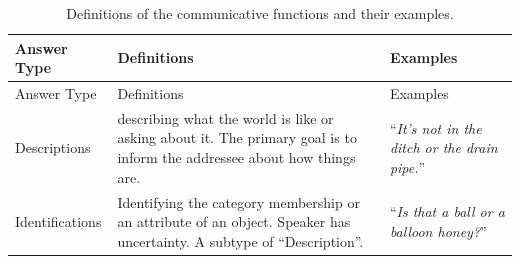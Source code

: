\documentclass[oneside]{report}
\theoremstyle{definition}
\theoremstyle{definition}
\theoremstyle{definition}
\theoremstyle{remark}
\begin{document}
\begin{longtable}[]{@{}lll@{}}
\caption{\label{tab:speechActs} Definitions of the communicative functions
and their examples.}\tabularnewline
\toprule
\begin{minipage}[b]{0.14\columnwidth}\raggedright\strut
Answer Type\strut
\end{minipage} & \begin{minipage}[b]{0.44\columnwidth}\raggedright\strut
Definitions\strut
\end{minipage} & \begin{minipage}[b]{0.33\columnwidth}\raggedright\strut
Examples\strut
\end{minipage}\tabularnewline
\midrule
\endfirsthead
\toprule
\begin{minipage}[b]{0.14\columnwidth}\raggedright\strut
Answer Type\strut
\end{minipage} & \begin{minipage}[b]{0.44\columnwidth}\raggedright\strut
Definitions\strut
\end{minipage} & \begin{minipage}[b]{0.33\columnwidth}\raggedright\strut
Examples\strut
\end{minipage}\tabularnewline
\midrule
\endhead
\begin{minipage}[t]{0.14\columnwidth}\raggedright\strut
Descriptions\strut
\end{minipage} & \begin{minipage}[t]{0.44\columnwidth}\raggedright\strut
describing what the world is like or asking about it. The primary goal
is to inform the addressee about how things are.\strut
\end{minipage} & \begin{minipage}[t]{0.33\columnwidth}\raggedright\strut
``\emph{It's not in the ditch or the drain pipe.}''\strut
\end{minipage}\tabularnewline
\begin{minipage}[t]{0.14\columnwidth}\raggedright\strut
Identifications\strut
\end{minipage} & \begin{minipage}[t]{0.44\columnwidth}\raggedright\strut
Identifying the category membership or an attribute of an object.
Speaker has uncertainty. A subtype of ``Description''.\strut
\end{minipage} & \begin{minipage}[t]{0.33\columnwidth}\raggedright\strut
``\emph{Is that a ball or a balloon honey?}''\strut
\end{minipage}\tabularnewline

\end{longtable}
\end{document}
